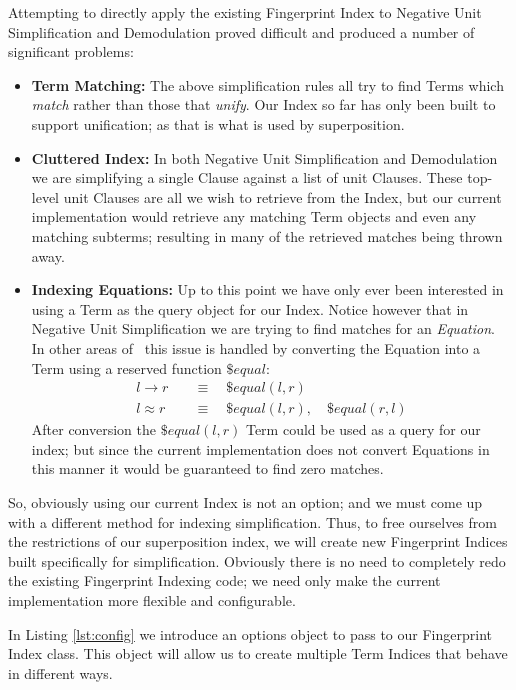Attempting to directly apply the existing Fingerprint Index to Negative Unit Simplification and
Demodulation proved difficult and produced a number of significant problems:
\begin{itemize}
\item \textbf{Term Matching:} The above simplification rules all try to find Terms which
\emph{match} rather than those that \emph{unify}. Our Index so far has only
been built to support unification; as that is what is used by superposition.
\item \textbf{Cluttered Index:} In both Negative Unit Simplification and Demodulation we are simplifying
a single Clause against a list of unit Clauses. These top-level unit Clauses are
all we wish to retrieve from the Index, but our current implementation would retrieve
any matching Term objects and even any matching subterms; resulting in many
of the retrieved matches being thrown away.
\item \textbf{Indexing Equations:} Up to this point we have only ever been interested
in using a Term as the query object for our Index. Notice however that in Negative
Unit Simplification we are trying to find matches for an \emph{Equation}. In other areas of \beagle\ 
this issue is handled by converting the Equation into a Term using a reserved
function $\$equal$:
\begin{align*}
l \to r &\quad\equiv\quad \$equal (l, r) \\
l \approx r &\quad\equiv\quad \$equal (l, r), \quad  \$equal (r, l)
\end{align*}
After conversion the $\$equal (l, r)$ Term could be used as a query for our index;
but since the current implementation does not convert Equations in this manner
it would be guaranteed to find zero matches.
\end{itemize}

So, obviously using our current Index is not an option; and we must come up with
a different method for indexing simplification. Thus, to free ourselves from
the restrictions of our superposition index, we will create new Fingerprint
Indices built specifically for simplification. Obviously there is no need
to completely redo the existing Fingerprint Indexing code; we need only
make the current implementation more flexible and configurable.

In Listing \ref{lst:config} we introduce an options object to pass to our Fingerprint Index class.
This object will allow us to create multiple Term Indices that behave in different
ways.


